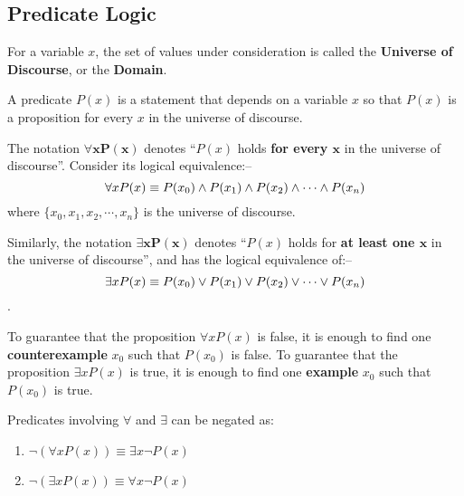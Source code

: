 \subsection{Predicate Logic}

\begin{definition}
    For a variable $x$, the set of values under consideration is called the \textbf{Universe of Discourse},
    or the \textbf{Domain}.
\end{definition}

\begin{definition}[Predicate]
    A predicate $P(x)$ is a statement that depends on a variable $x$ so that $P(x)$ is a proposition
    for every $x$ in the universe of discourse.
\end{definition}

\begin{definition}
    The notation $\boldsymbol{\forall x P(x)}$
    denotes ``$P(x)$ holds \textbf{for every $\boldsymbol{x}$} in the universe of discourse''.
    Consider its logical equivalence:--
    $$
    \forall x P(x) \equiv P(x_0) \wedge P(x_1) \wedge P(x_2) \wedge \cdots \wedge P(x_n)
    $$
    where $\{x_0, x_1, x_2, \cdots, x_n\}$ is the universe of discourse.

    Similarly, the notation $\boldsymbol{\exists x P(x)}$ denotes ``$P(x)$ holds for \textbf{at least one $\boldsymbol{x}$}
    in the universe of discourse'', and has the logical equivalence of:--
    $$
    \exists x P(x) \equiv P(x_0) \vee P(x_1) \vee P(x_2) \vee \cdots \vee P(x_n)
    $$.
\end{definition}

\begin{theorem}
    To guarantee that the proposition $\forall x P(x)$ is false, it is enough to find one
    \textbf{counterexample} $x_0$ such that $P(x_0)$ is false.
    To guarantee that the proposition $\exists x P(x)$ is true, it is enough to find one
    \textbf{example} $x_0$ such that $P(x_0)$ is true.
\end{theorem}

\begin{theorem}
    Predicates involving $\forall$ and $\exists$ can be negated as:
    \begin{multicols}{2}
        \begin{enumerate}
            \item $\neg(\forall xP(x)) \equiv \exists x \neg P(x)$
            \item $\neg(\exists xP(x)) \equiv \forall x \neg P(x)$
        \end{enumerate}
    \end{multicols}
\end{theorem}

